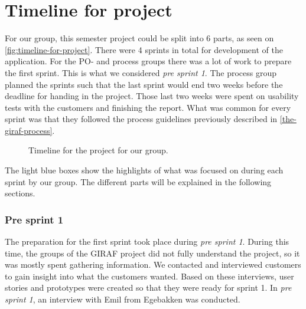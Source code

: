 \section{Timeline for project}
For our group, this semester project could be split into 6 parts, as seen on \autoref{fig:timeline-for-project}.
There were 4 sprints in total for development of the application. 
For the PO- and process groups there was a lot of work to prepare the first sprint.
This is what we considered \textit{pre sprint 1}.
The process group planned the sprints such that the last sprint would end two weeks before the deadline for handing in the project.
Those last two weeks were spent on usability tests with the customers and finishing the report.
What was common for every sprint was that they followed the process guidelines previously described in \autoref{the-giraf-process}.

\begin{figure}[H]
    \caption{\label{fig:timeline-for-project} Timeline for the project for our group.}
\end{figure}

\noindent The light blue boxes show the highlights of what was focused on during each sprint by our group.
The different parts will be explained in the following sections.

\subsubsection{Pre sprint 1}
The preparation for the first sprint took place during \textit{pre sprint 1}.
During this time, the groups of the GIRAF project did not fully understand the project, so it was mostly spent gathering information.
We contacted and interviewed customers to gain insight into what the customers wanted.
Based on these interviews, user stories and prototypes were created so that they were ready for sprint 1.
In \textit{pre sprint 1}, an interview with Emil from Egebakken was conducted. 

